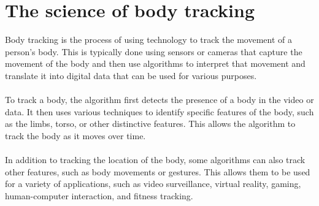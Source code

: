 \section{The science of body tracking}
Body tracking is the process of using technology to track the movement of a person's body.
This is typically done using sensors or cameras that capture the movement of the body and 
then use algorithms to interpret that movement and translate it into digital data that can 
be used for various purposes. 
\\
\\
To track a body, the algorithm first detects the presence of a body in the video or data.
It then uses various techniques to identify specific features of the body, such as the limbs, 
torso, or other distinctive features. This allows the algorithm to track the body as it moves over time. 
\\
\\
In addition to tracking the location of the body, some algorithms can also track 
other features, such as body movements or gestures. This allows them to be used for a 
variety of applications, such as video surveillance, virtual reality, gaming, human-computer 
interaction, and fitness tracking.


